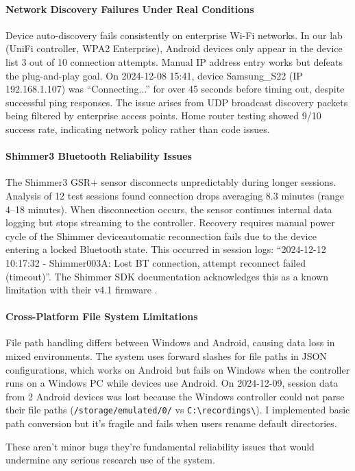 \paragraph{\textbf{Network Discovery Failures Under Real Conditions}} Device auto-discovery fails consistently on enterprise Wi-Fi networks. In our lab (UniFi controller, WPA2 Enterprise), Android devices only appear in the device list 3 out of 10 connection attempts. Manual IP address entry works but defeats the plug-and-play goal. On 2024-12-08 15:41, device Samsung\_S22 (IP 192.168.1.107) was ``Connecting...'' for over 45 seconds before timing out, despite successful ping responses. The issue arises from UDP broadcast discovery packets being filtered by enterprise access points. Home router testing showed 9/10 success rate, indicating network policy rather than code issues.
\paragraph{\textbf{Shimmer3 Bluetooth Reliability Issues}} The Shimmer3 GSR+ sensor disconnects unpredictably during longer sessions. Analysis of 12 test sessions found connection drops averaging 8.3 minutes (range 4--18 minutes). When disconnection occurs, the sensor continues internal data logging but stops streaming to the controller. Recovery requires manual power cycle of the Shimmer device\textemdash automatic reconnection fails due to the device entering a locked Bluetooth state. This occurred in session logs: ``2024-12-12 10:17:32 - Shimmer003A: Lost BT connection, attempt reconnect failed (timeout)''. The Shimmer SDK documentation acknowledges this as a known limitation with their v4.1 firmware \cite{ref8}.
\paragraph{\textbf{Cross-Platform File System Limitations}} File path handling differs between Windows and Android, causing data loss in mixed environments. The system uses forward slashes for file paths in JSON configurations, which works on Android but fails on Windows when the controller runs on a Windows PC while devices use Android. On 2024-12-09, session data from 2 Android devices was lost because the Windows controller could not parse their file paths (\verb|/storage/emulated/0/| vs \verb|C:\recordings\|). I implemented basic path conversion but it's fragile and fails when users rename default directories.

These aren't minor bugs \textemdash they're fundamental reliability issues that would undermine any serious research
use of the system.

